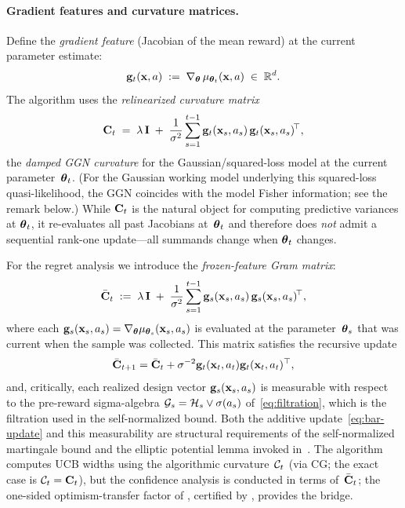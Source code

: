 \paragraph{Gradient features and curvature matrices.}
Define the \emph{gradient feature} (Jacobian of the mean reward) at the
current parameter estimate:
\begin{equation}\label{eq:gfeat}
  \mathbf{g}_t(\mathbf{x},a) \;:=\; \nabla_{\boldsymbol{\theta}}\,\mu_{\boldsymbol{\theta}_t}(\mathbf{x},a)
  \;\in\;\mathbb{R}^d.
\end{equation}
The algorithm uses the \emph{relinearized curvature matrix}
\begin{equation}\label{eq:curvature}
  \mathbf{C}_t
  \;=\;
  \lambda\,\mathbf{I}
  \;+\;
  \frac{1}{\sigma^2}\sum_{s=1}^{t-1}
    \mathbf{g}_t(\mathbf{x}_s,a_s)\,\mathbf{g}_t(\mathbf{x}_s,a_s)^{\!\top},
\end{equation}
the \emph{damped GGN curvature} for the Gaussian/squared-loss model
at the current parameter~$\boldsymbol{\theta}_t$.
(For the Gaussian working model underlying this squared-loss quasi-likelihood,
the GGN coincides with the model Fisher information; see the remark below.)
While $\mathbf{C}_t$ is the natural object for
computing predictive variances at $\boldsymbol{\theta}_t$, it
re-evaluates all past Jacobians at~$\boldsymbol{\theta}_t$ and therefore does
\emph{not} admit a sequential rank-one update---all summands change
when $\boldsymbol{\theta}_t$ changes.

For the regret analysis we introduce the
\emph{frozen-feature Gram matrix}:
\begin{equation}\label{eq:curvature-bar}
  \bar{\mathbf{C}}_t
  \;:=\;
  \lambda\,\mathbf{I}
  \;+\;
  \frac{1}{\sigma^2}\sum_{s=1}^{t-1}
    \mathbf{g}_s(\mathbf{x}_s,a_s)\,\mathbf{g}_s(\mathbf{x}_s,a_s)^{\!\top},
\end{equation}
where each $\mathbf{g}_s(\mathbf{x}_s,a_s)=\nabla_{\boldsymbol{\theta}}\mu_{\boldsymbol{\theta}_s}(\mathbf{x}_s,a_s)$
is evaluated at the parameter~$\boldsymbol{\theta}_s$ that was current when the sample
was collected.  This matrix satisfies the recursive update
\begin{equation}\label{eq:bar-update}
  \bar{\mathbf{C}}_{t+1}=\bar{\mathbf{C}}_t+\sigma^{-2}\mathbf{g}_t(\mathbf{x}_t,a_t)\mathbf{g}_t(\mathbf{x}_t,a_t)^\top,
\end{equation}
and, critically, each realized design vector
$\mathbf{g}_s(\mathbf{x}_s,a_s)$ is measurable with respect to the pre-reward
sigma-algebra $\mathcal{G}_s=\mathcal{H}_s\vee\sigma(a_s)$ of~\eqref{eq:filtration},
which is the filtration used in the self-normalized bound.
Both the additive update~\eqref{eq:bar-update} and
this measurability are structural requirements of the
self-normalized martingale bound and the elliptic potential lemma invoked
in~.
The algorithm computes UCB widths using the algorithmic curvature~$\mathcal{C}_t$
(via CG; the exact case is $\mathcal{C}_t=\mathbf{C}_t$), but the confidence analysis is
conducted in terms of~$\bar{\mathbf{C}}_t$; the one-sided optimism-transfer factor
of , certified by , provides the
bridge.

